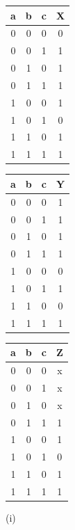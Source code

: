 \documentclass{article}
\begin{document}
    \begin{center}
        \begin{tabular} {ccc|c}
            a & b & c & X \\
            \hline
            0 & 0 & 0 & 0 \\
            0 & 0 & 1 & 1 \\
            0 & 1 & 0 & 1 \\
            0 & 1 & 1 & 1 \\
            1 & 0 & 0 & 1 \\
            1 & 0 & 1 & 0 \\
            1 & 1 & 0 & 1 \\
            1 & 1 & 1 & 1 \\
        \end{tabular}
        \quad\quad
        \begin{tabular} {ccc|c}
            a & b & c & Y \\
            \hline
            0 & 0 & 0 & 1 \\
            0 & 0 & 1 & 1 \\
            0 & 1 & 0 & 1 \\
            0 & 1 & 1 & 1 \\
            1 & 0 & 0 & 0 \\
            1 & 0 & 1 & 1 \\
            1 & 1 & 0 & 0 \\
            1 & 1 & 1 & 1 \\
        \end{tabular}
        \quad\quad
        \begin{tabular} {ccc|c}
            a & b & c & Z \\
            \hline
            0 & 0 & 0 & x \\
            0 & 0 & 1 & x \\
            0 & 1 & 0 & x \\
            0 & 1 & 1 & 1 \\
            1 & 0 & 0 & 1 \\
            1 & 0 & 1 & 0 \\
            1 & 1 & 0 & 1 \\
            1 & 1 & 1 & 1 \\
        \end{tabular}
    \end{center}

    \quad\quad (i)
\end{document}
